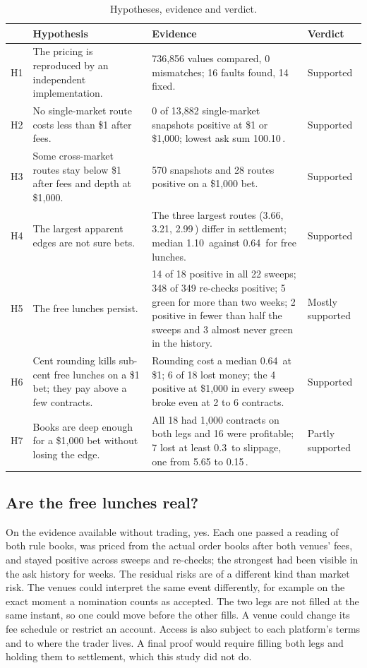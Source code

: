 \documentclass[5p,letterpaper]{elsarticle}
\newcommand{\cent}{\textcent}
\begin{document}
\begin{table}[t]
\caption{Hypotheses, evidence and verdict.}\label{tab:hypotheses}
\footnotesize
\begin{tabularx}{\textwidth}{@{}lLLl@{}}
\toprule
 & Hypothesis & Evidence & Verdict \\
\midrule
H1 & The pricing is reproduced by an independent implementation. & 736,856 values compared, 0 mismatches; 16 faults found, 14 fixed. & Supported \\
H2 & No single-market route costs less than \$1 after fees. & 0 of 13,882 single-market snapshots positive at \$1 or \$1,000; lowest ask sum 100.10\,\cent. & Supported \\
H3 & Some cross-market routes stay below \$1 after fees and depth at \$1,000. & 570 snapshots and 28 routes positive on a \$1,000 bet. & Supported \\
H4 & The largest apparent edges are not sure bets. & The three largest routes (3.66, 3.21, 2.99\,\cent) differ in settlement; median 1.10\,\cent{} against 0.64\,\cent{} for free lunches. & Supported \\
H5 & The free lunches persist. & 14 of 18 positive in all 22 sweeps; 348 of 349 re-checks positive; 5 green for more than two weeks; 2 positive in fewer than half the sweeps and 3 almost never green in the history. & Mostly supported \\
H6 & Cent rounding kills sub-cent free lunches on a \$1 bet; they pay above a few contracts. & Rounding cost a median 0.64\,\cent{} at \$1; 6 of 18 lost money; the 4 positive at \$1,000 in every sweep broke even at 2 to 6 contracts. & Supported \\
H7 & Books are deep enough for a \$1,000 bet without losing the edge. & All 18 had 1,000 contracts on both legs and 16 were profitable; 7 lost at least 0.3\,\cent{} to slippage, one from 5.65 to 0.15\,\cent. & Partly supported \\
\bottomrule
\end{tabularx}
\end{table}

\subsection{Are the free lunches real?}

On the evidence available without trading, yes. Each one passed a reading of both rule books, was priced from the actual order books after both venues' fees, and stayed positive across sweeps and re-checks; the strongest had been visible in the ask history for weeks. The residual risks are of a different kind than market risk. The venues could interpret the same event differently, for example on the exact moment a nomination counts as accepted. The two legs are not filled at the same instant, so one could move before the other fills. A venue could change its fee schedule or restrict an account. Access is also subject to each platform's terms and to where the trader lives. A final proof would require filling both legs and holding them to settlement, which this study did not do.
\end{document}
